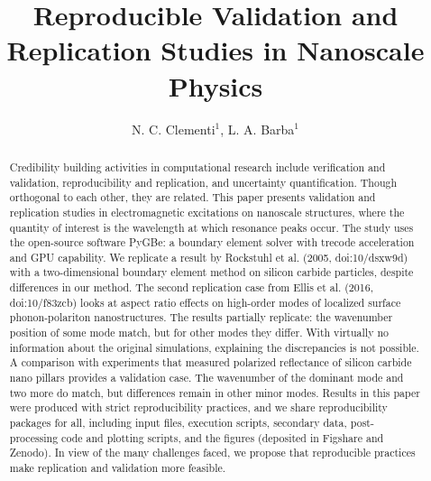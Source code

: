 \documentclass{rstransa} %
\begin{document}
\title{Reproducible Validation and Replication Studies in Nanoscale Physics}

\author{%
N. C. Clementi$^{1}$, L. A. Barba$^{1}$}

\address{$^{1}$Department of Mechanical and Aerospace Engineering, 
The George Washington University, Washington D.C., USA }

\subject{computer modeling and simulation, computational physics}



\begin{abstract}
    Credibility building activities in computational research include
    verification and validation, reproducibility and replication, and
    uncertainty quantification. Though orthogonal to each other, they are
    related. This paper presents validation and replication studies in 
    electromagnetic excitations on nanoscale structures, where the quantity
    of interest is the wavelength at which resonance peaks occur. 
    The study uses the open-source software PyGBe: a boundary element
    solver with trecode acceleration and GPU capability.
    We replicate a result by Rockstuhl et al. (2005, doi:10/dsxw9d) with a
    two-dimensional boundary element method on silicon carbide particles,
    despite differences in our method. 
    The second replication case from Ellis et al. (2016, doi:10/f83zcb) looks
    at aspect ratio effects on high-order modes of localized surface phonon-polariton
    nanostructures. The results partially replicate: the wavenumber
    position of some mode match, but for other modes they differ.
    With virtually no information about the original simulations, 
    explaining the discrepancies is not possible. 
    A comparison with experiments that measured polarized reflectance 
    of silicon carbide nano pillars provides a validation case.
    The wavenumber of the dominant mode and two more do match, but 
    differences remain in other minor modes. 
    Results in this paper were produced with strict reproducibility
    practices, and we share reproducibility packages for all, including
    input files, execution scripts, secondary data, post-processing code and
    plotting scripts, and the figures (deposited in Figshare and Zenodo).
    In view of the many challenges faced, we propose that reproducible
    practices make replication and validation more feasible.

    \end{abstract}
    
\end{document}
